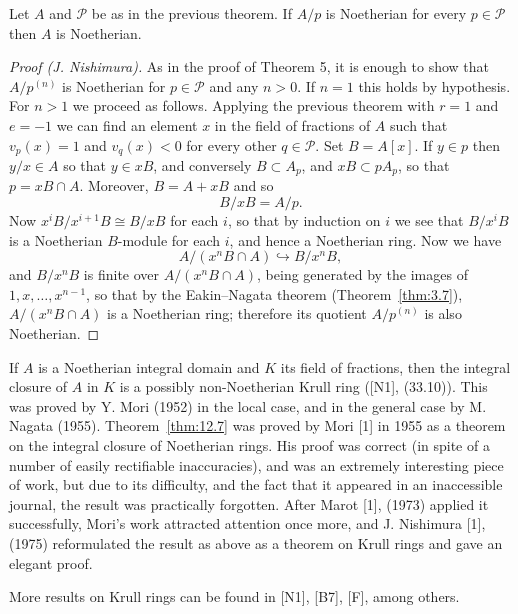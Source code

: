 \begin{theorem}\label{thm:12.7}
Let $A$ and $\mathcal{P}$ be as in the previous
theorem. If $A/p$ is Noetherian for every $p \in \mathcal{P}$ then $A$ is Noetherian.
\end{theorem}

\begin{proof}[Proof (J. Nishimura)]
As in the proof of Theorem 5, it is enough to show
that $A/p^{(n)}$ is Noetherian for $p \in \mathcal{P}$ and any $n > 0$. If $n = 1$ this holds by
hypothesis. For $n > 1$ we proceed as follows. Applying the previous
theorem with $r = 1$ and $e = -1$ we can find an element $x$ in the field of
fractions of $A$ such that $v_p(x) = 1$ and $v_q(x) < 0$ for every other $q \in \mathcal{P}$. Set
$B = A[x]$. If $y \in p$ then $y/x \in A$ so that $y \in xB$, and conversely $B \subset A_p$, and
$xB \subset pA_p$, so that $p = xB \cap A$. Moreover, $B = A + xB$ and so
\[
  B/xB = A/p.
\]
Now $x^iB/x^{i+1}B \cong B/xB$ for each $i$, so that by induction on $i$ we see that
$B/x^iB$ is a Noetherian $B$-module for each $i$, and hence a Noetherian ring.
Now we have
\[
  A/(x^nB \cap A) \hookrightarrow B/x^nB,
\]
and $B/x^nB$ is finite over $A/(x^nB \cap A)$, being generated by the images of
$1, x, \ldots, x^{n-1}$, so that by the Eakin--Nagata theorem (Theorem~\ref{thm:3.7}),
$A/(x^nB \cap A)$ is a Noetherian ring; therefore its quotient $A/p^{(n)}$ is also
Noetherian.
\end{proof}

\begin{remark}
If $A$ is a Noetherian integral domain and $K$ its field of fractions,
then the integral closure of $A$ in $K$ is a possibly non-Noetherian Krull ring
([N1], (33.10)). This was proved by Y. Mori (1952) in the local case, and
in the general case by M. Nagata (1955). Theorem~\ref{thm:12.7} was proved by
Mori [1] in 1955 as a theorem on the integral closure of Noetherian
rings. His proof was correct (in spite of a number of easily rectifiable
inaccuracies), and was an extremely interesting piece of work, but due to
its difficulty, and the fact that it appeared in an inaccessible journal, the
result was practically forgotten. After Marot [1], (1973) applied it
successfully, Mori's work attracted attention once more, and J. Nishimura
[1], (1975) reformulated the result as above as a theorem on Krull rings
and gave an elegant proof.

More results on Krull rings can be found in [N1], [B7], [F], among
others.
\end{remark}

